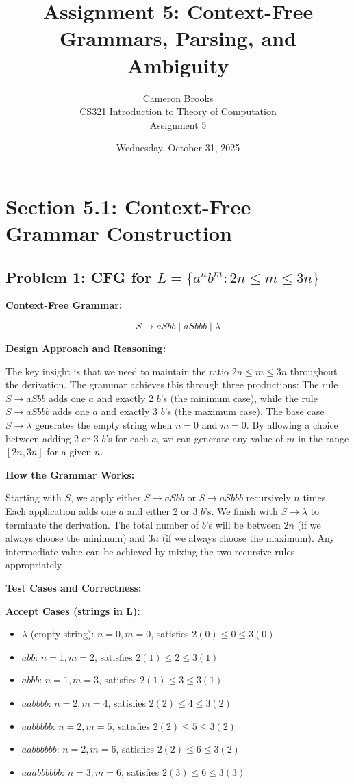\documentclass[12pt]{article}
\title{Assignment 5: Context-Free Grammars, Parsing, and Ambiguity}
\author{Cameron Brooks \\
        CS321 Introduction to Theory of Computation \\
        Assignment 5}
\date{Wednesday, October 31, 2025}
\begin{document}
\maketitle
\thispagestyle{empty}

\newpage
\tableofcontents
\newpage

\section{Section 5.1: Context-Free Grammar Construction}

\subsection{Problem 1: CFG for $L = \{a^n b^m : 2n \le m \le 3n\}$}

\textbf{Context-Free Grammar:}

$$S \rightarrow aSbb \mid aSbbb \mid \lambda$$

\textbf{Design Approach and Reasoning:}

The key insight is that we need to maintain the ratio $2n \le m \le 3n$ throughout the derivation. The grammar achieves this through three productions: The rule $S \rightarrow aSbb$ adds one $a$ and exactly 2 $b$'s (the minimum case), while the rule $S \rightarrow aSbbb$ adds one $a$ and exactly 3 $b$'s (the maximum case). The base case $S \rightarrow \lambda$ generates the empty string when $n=0$ and $m=0$. By allowing a choice between adding 2 or 3 $b$'s for each $a$, we can generate any value of $m$ in the range $[2n, 3n]$ for a given $n$.

\textbf{How the Grammar Works:}

Starting with $S$, we apply either $S \rightarrow aSbb$ or $S \rightarrow aSbbb$ recursively $n$ times. Each application adds one $a$ and either 2 or 3 $b$'s. We finish with $S \rightarrow \lambda$ to terminate the derivation. The total number of $b$'s will be between $2n$ (if we always choose the minimum) and $3n$ (if we always choose the maximum). Any intermediate value can be achieved by mixing the two recursive rules appropriately.

\textbf{Test Cases and Correctness:}

\textbf{Accept Cases (strings in L):}
\begin{itemize}
\item $\lambda$ (empty string): $n=0, m=0$, satisfies $2(0) \le 0 \le 3(0)$ \checkmark
\item $abb$: $n=1, m=2$, satisfies $2(1) \le 2 \le 3(1)$ \checkmark
\item $abbb$: $n=1, m=3$, satisfies $2(1) \le 3 \le 3(1)$ \checkmark
\item $aabbbb$: $n=2, m=4$, satisfies $2(2) \le 4 \le 3(2)$ \checkmark
\item $aabbbbb$: $n=2, m=5$, satisfies $2(2) \le 5 \le 3(2)$ \checkmark
\item $aabbbbbb$: $n=2, m=6$, satisfies $2(2) \le 6 \le 3(2)$ \checkmark
\item $aaabbbbbb$: $n=3, m=6$, satisfies $2(3) \le 6 \le 3(3)$ \checkmark
\end{itemize}
\end{document}
